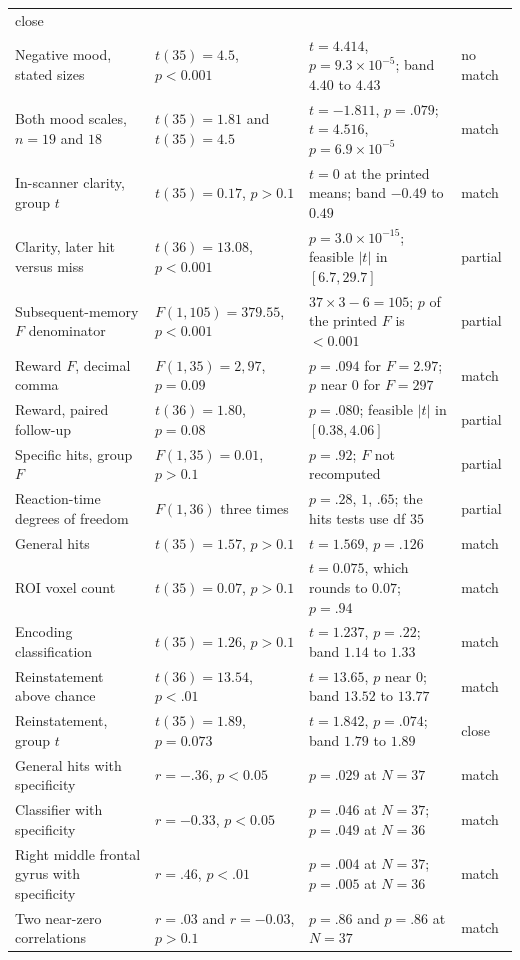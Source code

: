 \documentclass[11pt]{article}
\begin{document}
\begin{footnotesize}
\begin{longtable}{@{}L{0.22\textwidth}L{0.24\textwidth}L{0.32\textwidth}L{0.12\textwidth}@{}}
close \\
Negative mood, stated sizes &
\(t(35)=4.5\), \(p<0.001\) &
\(t=4.414\), \(p=9.3\times 10^{-5}\); band \(4.40\) to \(4.43\) &
no match \\
Both mood scales, \(n=19\) and \(18\) &
\(t(35)=1.81\) and \(t(35)=4.5\) &
\(t=-1.811\), \(p=.079\); \(t=4.516\), \(p=6.9\times 10^{-5}\) &
match \\
In-scanner clarity, group \(t\) &
\(t(35)=0.17\), \(p>0.1\) &
\(t=0\) at the printed means; band \(-0.49\) to \(0.49\) &
match \\
Clarity, later hit versus miss &
\(t(36)=13.08\), \(p<0.001\) &
\(p=3.0\times 10^{-15}\); feasible \(|t|\) in \([6.7, 29.7]\) &
partial \\
Subsequent-memory \(F\) denominator &
\(F(1,105)=379.55\), \(p<0.001\) &
\(37\times 3-6=105\); \(p\) of the printed \(F\) is \(<0.001\) &
partial \\
Reward \(F\), decimal comma &
\(F(1,35)=2{,}97\), \(p=0.09\) &
\(p=.094\) for \(F=2.97\); \(p\) near \(0\) for \(F=297\) &
match \\
Reward, paired follow-up &
\(t(36)=1.80\), \(p=0.08\) &
\(p=.080\); feasible \(|t|\) in \([0.38, 4.06]\) &
partial \\
Specific hits, group \(F\) &
\(F(1,35)=0.01\), \(p>0.1\) &
\(p=.92\); \(F\) not recomputed &
partial \\
Reaction-time degrees of freedom &
\(F(1,36)\) three times &
\(p=.28\), \(1\), \(.65\); the hits tests use df \(35\) &
partial \\
General hits &
\(t(35)=1.57\), \(p>0.1\) &
\(t=1.569\), \(p=.126\) &
match \\
ROI voxel count &
\(t(35)=0.07\), \(p>0.1\) &
\(t=0.075\), which rounds to \(0.07\); \(p=.94\) &
match \\
Encoding classification &
\(t(35)=1.26\), \(p>0.1\) &
\(t=1.237\), \(p=.22\); band \(1.14\) to \(1.33\) &
match \\
Reinstatement above chance &
\(t(36)=13.54\), \(p<.01\) &
\(t=13.65\), \(p\) near \(0\); band \(13.52\) to \(13.77\) &
match \\
Reinstatement, group \(t\) &
\(t(35)=1.89\), \(p=0.073\) &
\(t=1.842\), \(p=.074\); band \(1.79\) to \(1.89\) &
close \\
General hits with specificity &
\(r=-.36\), \(p<0.05\) &
\(p=.029\) at \(N=37\) &
match \\
Classifier with specificity &
\(r=-0.33\), \(p<0.05\) &
\(p=.046\) at \(N=37\); \(p=.049\) at \(N=36\) &
match \\
Right middle frontal gyrus with specificity &
\(r=.46\), \(p<.01\) &
\(p=.004\) at \(N=37\); \(p=.005\) at \(N=36\) &
match \\
Two near-zero correlations &
\(r=.03\) and \(r=-0.03\), \(p>0.1\) &
\(p=.86\) and \(p=.86\) at \(N=37\) &
match \\
\bottomrule
\end{longtable}
\end{footnotesize}
\end{document}
